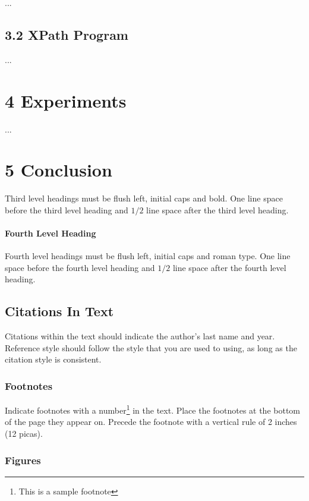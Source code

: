 \documentclass[a4paper]{article}
\begin{document}
...

\subsection{3.2 XPath Program }

...

\section{4 Experiments }

...

\section{5 Conclusion }

Third level headings must be flush left, initial caps and bold.
One line space before the third level heading and $1/2$ line
space after the third level heading.

\paragraph{Fourth Level Heading}

Fourth level headings must be flush left, initial caps and roman type.
One line space before the fourth level heading and $1/2$ line
space after the fourth level heading.

\subsection{Citations In Text}

Citations within the text should indicate the author's last name and
year\cite{Knuth-vol3}. Reference style\cite{Comer-btree}
should follow the style that you are used to using, as long as the
citation style is consistent.

\subsubsection{Footnotes}

Indicate footnotes with a number\footnote{This is a sample footnote} in
the text. Place the footnotes at the bottom of the page they appear on.
Precede the footnote with a vertical rule of 2 inches (12 picas).

\subsubsection{Figures}
\end{document}
